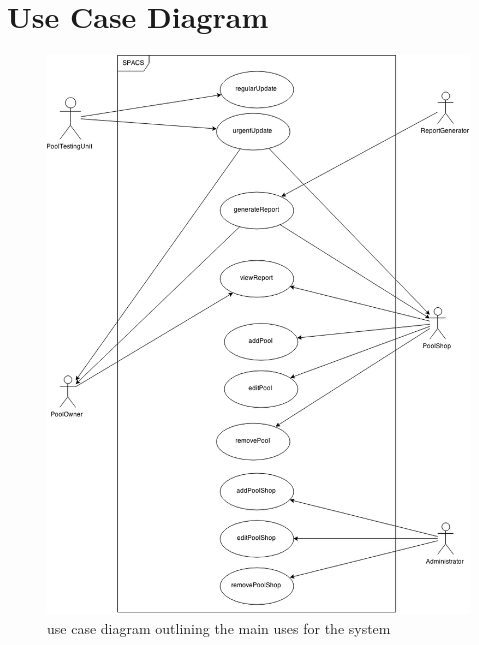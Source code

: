 \newcommand{\usecase}[7]{
\begin{center}
\begin{tabular}[h!]{| l | p{12cm} |}
	\hline
	\textbf{Name} & #1 \\ \hline
	\textbf{Actors} & #2 \\ \hline
	\textbf{Goal} & #3 \\ \hline
	\textbf{Preconditions} & #4 \\ \hline
	\textbf{Basic Flow} & #5 \\ \hline
	\textbf{Alternative Flow} & #6 \\ \hline
	\textbf{Postconditions} & #7 \\ \hline
\end{tabular}
\end{center}
}

\section{Use Case Diagram}

\begin{figure}[h!]
\begin{center}
	\includegraphics[width=13cm]{images/UseCaseDiagram}
	\caption{use case diagram outlining the main uses for the system}
\end{center}
\end{figure}


